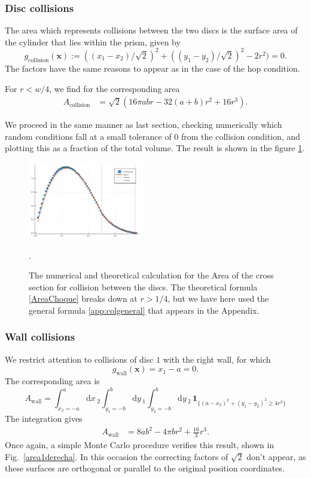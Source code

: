 \documentclass[superscriptaddress,pre,reprint,showpacs,onecolumn]{revtex4-1}
\newcommand{\rd}[1]{\mathrm{d}{#1} \,}
\newcommand{\indicatorsymbol}{\mathbf{1}}
\newcommand{\indicator}[1]{\indicatorsymbol_{ \{   #1 \} } }
\begin{document}
\subsubsection{Disc collisions}

The area which represents collisions between the two discs is the surface area of the cylinder
that lies within the prism, given by
$$g_\text{collision}(\mathbf{x}) := ((x_1-x_2)/\sqrt{2})^2 + ((y_1-y_2)/\sqrt{2})^2
- 2r^2) = 0.$$
The factors have the same reasons to appear as in the case of the hop condition.

For $r<w/4$, we find for the corresponding area
\begin{align}\label{AreaChoque}
A_\text{collision} & =  \sqrt{2} (
16\pi a b r -32 (a+b)r^2 +16 r^3).
\end{align}

We proceed in the same manner as last section, checking numerically which
random
conditions fall at a small tolerance of $0$ from the collision condition, and
plotting this as a fraction of the total volume. The result is shown in the
figure \ref{AreaChoqueTeoyNum}. 
\begin{figure}
\centering
\includegraphics[width=0.45\textwidth]{./figures/AreaCol01.png}
\caption{The numerical and theoretical calculation for the Area of the cross section
for collision between the discs.  The theoretical formula 
\ref{AreaChoque} breaks down at
$r>1/4$, but we have here used the general formula \ref{app:colgeneral}
that appears in the Appendix.}
\label{AreaChoqueTeoyNum}.
\end{figure}


\subsubsection{Wall collisions}

We restrict attention to collisions of disc $1$ with the right wall, for which
$$g_\text{wall}(\mathbf{x}) = x_1 - a = 0.$$
The corresponding area is
\begin{equation}\label{areaindic}
 A_\mathrm{wall} =  \int_{x_2 = -a}^a \rd x_2 
\int_{y_1 = -b}^b \rd y_1 \int_{y_2 = -b}^b \rd y_2 \, \indicator{ (a-x_2)^2 + (y_1-y_2)^2 \ge 4 r^2 }
\end{equation}
The integration gives
\begin{align}\label{areax1p}
 A_\mathrm{wall} & = 8 a b^2-4  \pi b r^2 +\frac{16}{3}r^3 .
\end{align}
Once again, a simple Monte Carlo procedure verifies this result,
shown in Fig.~\ref{area1derecha}.
In this occasion the correcting factors of $\sqrt{2}$ don't appear, as
these surfaces are orthogonal or parallel to the original
position coordinates.
\end{document}
